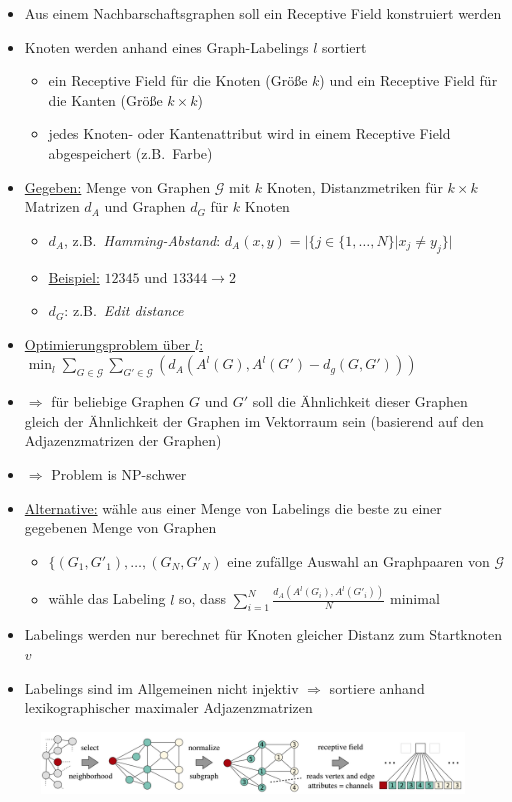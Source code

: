 \begin{itemize}
  \item Aus einem Nachbarschaftsgraphen soll ein Receptive Field konstruiert werden
  \item Knoten werden anhand eines Graph-Labelings $l$ sortiert
  \begin{itemize}
    \item ein Receptive Field für die Knoten (Größe $k$) und ein Receptive Field für die Kanten (Größe $k \times k$)
    \item jedes Knoten- oder Kantenattribut wird in einem Receptive Field abgespeichert (z.B.\ Farbe)
  \end{itemize}
  \item \underline{Gegeben:} Menge von Graphen $\mathcal{G}$ mit $k$ Knoten, Distanzmetriken für $k \times k$ Matrizen $d_A$ und Graphen $d_G$ für $k$ Knoten
  \begin{itemize}
    \item $d_A$, z.B.\ \emph{Hamming-Abstand}: $d_A(x, y) = | \lbrace j \in \lbrace 1, \ldots, N \rbrace | x_j \neq y_j \rbrace |$
    \item \underline{Beispiel:} $12345$ und $13344 \rightarrow 2$
    \item $d_G$: z.B.\ \emph{Edit distance}
  \end{itemize}
  \item \underline{Optimierungsproblem über $l$:} $\min_l \sum_{G \in \mathcal{G}} \sum_{G' \in \mathcal{G}} {( d_A(A^l(G), A^l(G') - d_g(G, G')) )}$
  \item $\Rightarrow$ für beliebige Graphen $G$ und $G'$ soll die Ähnlichkeit dieser Graphen gleich der Ähnlichkeit der Graphen im Vektorraum sein (basierend auf den Adjazenzmatrizen der Graphen)
  \item $\Rightarrow$ Problem is NP-schwer
  \item \underline{Alternative:} wähle aus einer Menge von Labelings die beste zu einer gegebenen Menge von Graphen
  \begin{itemize}
    \item $\lbrace (G_1, G'_1), \ldots, (G_N, G'_N)$ eine zufällge Auswahl an Graphpaaren von $\mathcal{G}$
    \item wähle das Labeling $l$ so, dass $\sum_{i=1}^N \frac{d_A(A^l(G_i), A^l(G'_i))}{N}$ minimal
  \end{itemize}
  \item Labelings werden nur berechnet für Knoten gleicher Distanz zum Startknoten $v$
  \item Labelings sind im Allgemeinen nicht injektiv $\Rightarrow$ sortiere anhand lexikographischer maximaler Adjazenzmatrizen
\end{itemize}

\begin{figure}[h]
  \centering
  \includegraphics[width=.9\textwidth]{images/normalization}
\end{figure}
